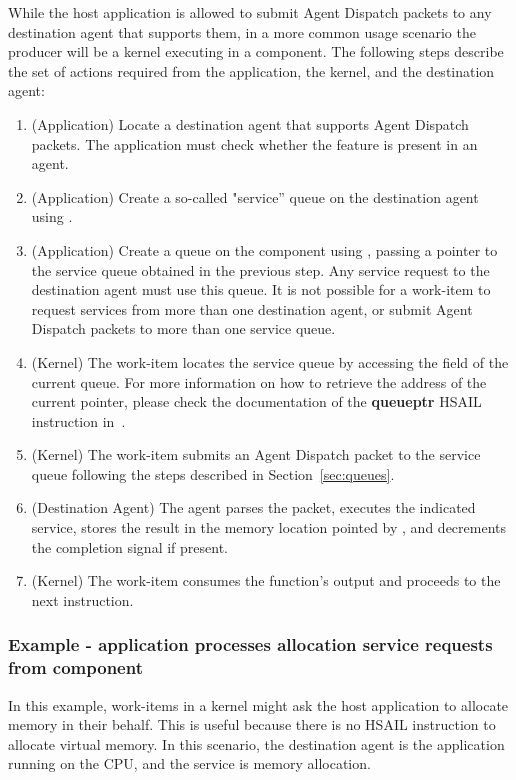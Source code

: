 \documentclass[final]{book}
\newcommand{\reffun}[1]{\textbf{#1}}
\newcommand{\refhsl}[1]{\reffun{#1}}
\begin{document}
While the host application is allowed to submit Agent Dispatch packets to any
destination agent that supports them, in a more common usage scenario the
producer will be a kernel executing in a component. The following steps describe
the set of actions required from the application, the kernel, and the
destination agent:
\begin{enumerate}[itemsep=1pt,topsep=3pt,partopsep=0pt]
\item (Application) Locate a destination agent that supports Agent Dispatch
  packets. The application must check whether the feature
   is present in an agent.
\item (Application) Create a so-called "service'' queue on the destination agent
  using .
\item (Application) Create a queue on the component using
  , passing a pointer to the service queue obtained in
  the previous step.  Any service request to the destination agent must use this
  queue. It is not possible for a work-item to request services from more than
  one destination agent, or submit Agent Dispatch packets to more than one
  service queue.
\item (Kernel) The work-item locates the service queue by accessing the
   field of the current queue. For more
  information on how to retrieve the address of the current pointer, please
  check the documentation of the \refhsl{queueptr} HSAIL instruction
  in~\cite{prm}.
\item (Kernel) The work-item submits an Agent Dispatch packet to the service
  queue following the steps described in Section~\ref{sec:queues}.
\item (Destination Agent) The agent parses the packet, executes the indicated
  service, stores the result in the memory location pointed by
  , and decrements the
  completion signal if present.
\item (Kernel) The work-item consumes the function's output and proceeds to the
  next instruction.
\end{enumerate}

\subsubsection{Example - application processes allocation service requests from
  component}
In this example, work-items in a kernel might ask the host application to
allocate memory in their behalf. This is useful because there is no HSAIL
instruction to allocate virtual memory. In this scenario, the destination agent
is the application running on the CPU, and the service is memory allocation.
\end{document}
